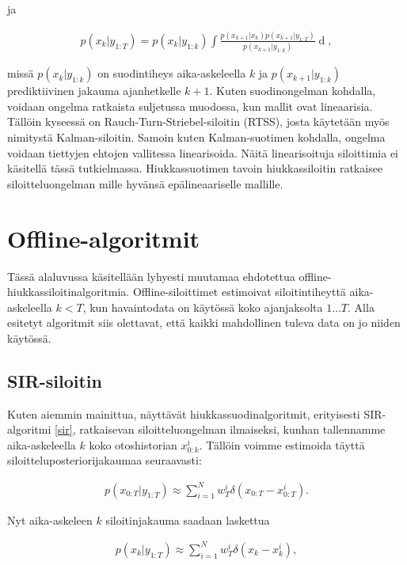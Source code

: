 \documentclass[
  12pt,
  a4paper, twoside]{book}
\begin{document}
ja

\begin{align}\label{siloitin-ratkaisu}
p(x_k|y_{1:T}) = p(x_k|y_{1:k}) \int \frac{p(x_{k+1}|x_k)p(x_{k+1}|y_{1:T})}{p(x_{k+1}|y_{1:k})} \mathop{dx_{k+1}},
\end{align}

\noindent missä \(p(x_k|y_{1:k})\) on suodintiheys aika-askeleella \(k\) ja \(p(x_{k+1}|y_{1:k})\) prediktiivinen jakauma ajanhetkelle \(k+1\). Kuten suodinongelman kohdalla, voidaan ongelma ratkaista suljetussa muodossa, kun mallit ovat lineaarisia. Tällöin kyseessä on Rauch-Turn-Striebel-siloitin (RTSS), josta käytetään myös nimitystä Kalman-siloitin. Samoin kuten Kalman-suotimen kohdalla, ongelma voidaan tiettyjen ehtojen vallitessa linearisoida. Näitä linearisoituja siloittimia ei käsitellä tässä tutkielmassa. Hiukkassuotimen tavoin hiukkassiloitin ratkaisee siloitteluongelman mille hyvänsä epälineaariselle mallille.

\section{Offline-algoritmit}

Tässä alaluvussa käsitellään lyhyesti muutamaa ehdotettua offline-hiukkassiloitinalgoritmia. Offline-siloittimet estimoivat siloitintiheyttä aika-askeleella \(k<T\), kun havaintodata on käytössä koko ajanjaksolta \(1 \ldots T\). Alla esitetyt algoritmit siis olettavat, että kaikki mahdollinen tuleva data on jo niiden käytössä.

\subsection{SIR-siloitin}

Kuten aiemmin mainittua, näyttävät hiukkassuodinalgoritmit, erityisesti SIR-algoritmi \ref{sir}, ratkaisevan siloitteluongelman ilmaiseksi, kunhan tallennamme aika-askeleella \(k\) koko otoshistorian \(x_{0:k}^i\). Tällöin voimme estimoida täyttä siloitteluposteriorijakaumaa seuraavasti:

\begin{align}\label{siloitin-posteriori}
p(x_{0:T}|y_{1:T}) \approx \sum_{i=1}^N w_T^i \delta (x_{0:T}-x_{0:T}^i).
\end{align}

Nyt aika-askeleen \(k\) siloitinjakauma saadaan laskettua

\begin{align}\label{siloitin-posteriori-k}
p(x_{k}|y_{1:T}) \approx \sum_{i=1}^N w_T^i \delta (x_{k}-x_{k}^i),
\end{align}
\end{document}
